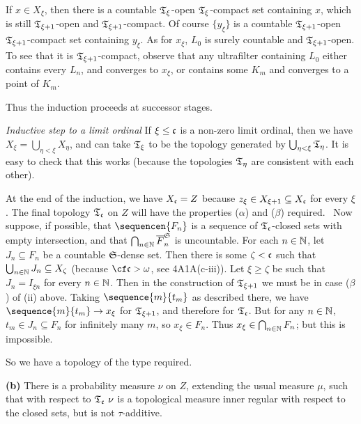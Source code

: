 {If $x\in X_{\xi}$, then there is a countable $\frak T_{\xi}$-open
$\frak T_{\xi}$-compact set containing $x$, which is still
$\frak T_{\xi+1}$-open and $\frak T_{\xi+1}$-compact.   Of course
$\{y_{\xi}\}$
is a countable $\frak T_{\xi+1}$-open $\frak T_{\xi+1}$-compact set
containing $y_{\xi}$.   As for $x_{\xi}$, $L_0$ is surely countable and
$\frak T_{\xi+1}$-open.   To see that it is $\frak T_{\xi+1}$-compact,
observe that any ultrafilter containing $L_0$ either contains every
$L_n$, and converges to $x_{\xi}$, or contains some $K_m$ and converges
to a point of $K_m$.

Thus the induction proceeds at successor stages.

\medskip

 {\it Inductive step to a limit ordinal} If
$\xi\le\frak c$ is a non-zero limit ordinal, then we have
$X_{\xi}=\bigcup_{\eta<\xi}X_{\eta}$, and can take $\frak T_{\xi}$ to be
the topology generated by $\bigcup_{\eta<\xi}\frak T_{\eta}$.   It is
easy to check that this works (because the topologies $\frak T_{\eta}$
are consistent with each other).

\medskip

 At the end of the induction, we have $X_{\frak c}=Z$
because $z_{\xi}\in X_{\xi+1}\subseteq X_{\frak c}$ for every $\xi$.
The final topology $\frak T_{\frak c}$ on $Z$ will have the properties
($\alpha$) and ($\beta$) required.   \Quer\ Now suppose, if possible,
that $\sequencen{F_n}$ is a sequence of $\frak T_{\frak c}$-closed sets
with empty intersection, and that
$\bigcap_{n\in\Bbb N}\overline{F}^{\frak S}_n$ is uncountable.   For
each $n\in\Bbb N$, let
$J_n\subseteq F_n$ be a countable $\frak S$-dense set.   Then there is
some $\zeta<\frak c$ such that
$\bigcup_{n\in\Bbb N}J_n\subseteq X_{\zeta}$ (because
$\cf\frak c>\omega$, see 4A1A(c-iii)).
Let $\xi\ge\zeta$ be such that $J_n=I_{\xi n}$ for every $n\in\Bbb N$.
Then in the construction of $\frak T_{\xi+1}$ we must be in case
($\beta$) of (ii) above.   Taking
$\sequence{m}{t_m}$ as described there, we have
$\sequence{m}{t_m}\to x_{\xi}$ for $\frak T_{\xi+1}$, and therefore for
$\frak T_{\frak c}$.
But for any $n\in\Bbb N$, $t_m\in J_n\subseteq F_n$ for infinitely many
$m$, so $x_{\xi}\in F_n$.   Thus $x_{\xi}\in\bigcap_{n\in\Bbb N}F_n$;
but this is impossible.\ \Bang

So we have a topology of the type required.\ \Qed

\medskip

{\bf (b)} There is a probability measure $\nu$ on $Z$, extending the
usual measure $\mu$, such that with respect to
$\frak T_{\frak c}\,\,\nu$ is a topological measure inner regular with
respect to the closed sets, but is not $\tau$-additive.

}
